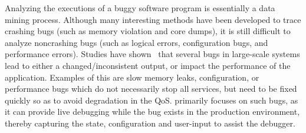 Analyzing the executions of a buggy software program is essentially a data mining process. 
Although many interesting methods have been developed to trace crashing bugs (such as memory violation and core dumps), 
it is still difficult to analyze noncrashing bugs (such as logical errors, configuration bugs, and performance errors).
Studies have shown~\cite{Zhang:2013:ADS:2486788.2486830, liu2005mining, kremenek2007factor} that several bugs in large-scale systems lead to either a changed/inconsistent output, or impact the performance of the application. 
Examples of this are slow memory leaks, configuration, or performance bugs which do not necessarily stop all services, 
but need to be fixed quickly so as to avoid degradation in the QoS. 
\parikshan primarily focuses on such bugs, as it can provide live debugging while the bug exists in the production environment, 
thereby capturing the state, configuration and user-input to assist the debugger.



